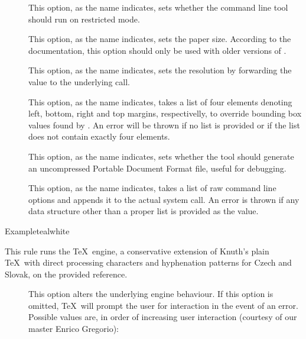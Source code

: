 \begin{description}
\begin{description}
\item[] This option, as the name indicates, sets whether the command line tool should run on restricted mode.

\item[] This option, as the name indicates, sets the paper size. According to the documentation, this option should only be used with older versions of .

\item[] This option, as the name indicates, sets the resolution by forwarding the value to the underlying  call.

\item[] This option, as the name indicates, takes a list of four elements denoting left, bottom, right and top margins, respectivelly, to override bounding box values found by . An error will be thrown if no list is provided or if the list does not contain exactly four elements.

\item[] This option, as the name indicates, sets whether the tool should generate an uncompressed Portable Document Format file, useful for debugging.

\item[] This option, as the name indicates, takes a list of raw command line options and appends it to the actual system call. An error is thrown if any data structure other than a proper list is provided as the value.
\end{description}

\begin{codebox}{Example}{teal}{\icnote}{white}
\end{codebox}

\item[\rulebox{pdfcsplain}]
This rule runs the  \TeX\ engine, a conservative extension of Knuth's plain \TeX\ with direct processing characters and hyphenation patterns for Czech and Slovak, on the provided  reference.

\begin{description}
\item[] This option alters the underlying engine behaviour. If this option is omitted, \TeX\ will prompt the user for interaction in the event of an error. Possible values are, in order of increasing user interaction (courtesy of our master Enrico Gregorio):


\end{description}
\end{description}
